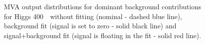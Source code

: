 \begin{figure}[!hbtp]
\caption{
MVA output distributions for dominant background contributions for
Higgs 400~\GeV\ without fitting (nominal - dashed blue line),
background fit (signal is set to zero - solid black line) and
signal+background fit (signal is floating in the fit - solid red
line).}
\label{fig:bdt2_400}
\end{figure}

